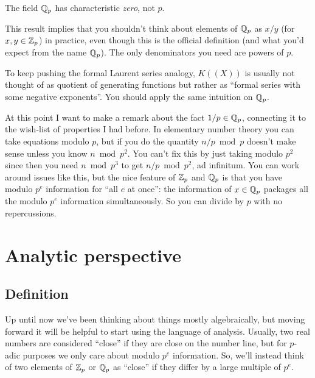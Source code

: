 \begin{remark}
	[Warning]
	The field $\mathbb Q_p$ has characteristic \emph{zero}, not $p$.
\end{remark}
\begin{remark}
	This result implies that you shouldn't think about elements of $\mathbb Q_p$
	as $x/y$ (for $x,y \in \mathbb Z_p$) in practice,
	even though this is the official definition
	(and what you'd expect from the name $\mathbb Q_p$).
	The only denominators you need are powers of $p$.

	To keep pushing the formal Laurent series analogy,
	$K((X))$ is usually not thought of as quotient of generating functions
	but rather as ``formal series with some negative exponents''.
	You should apply the same intuition on $\mathbb Q_p$.
\end{remark}

\begin{remark}
At this point I want to make a remark about the fact $1/p \in \mathbb Q_p$,
connecting it to the wish-list of properties I had before.
In elementary number theory you can take equations modulo $p$,
but if you do the quantity $n/p \bmod{p}$ doesn't make sense
unless you know $n \bmod{p^2}$.
You can't fix this by just taking modulo $p^2$
since then you need $n \bmod{p^3}$ to get $n/p \bmod{p^2}$, ad infinitum.
You can work around issues like this,
but the nice feature of $\mathbb Z_p$ and $\mathbb Q_p$
is that you have modulo $p^e$ information for ``all $e$ at once'':
the information of $x \in \mathbb Q_p$ packages all the modulo $p^e$
information simultaneously.
So you can divide by $p$ with no repercussions.
\end{remark}


\section{Analytic perspective}
\subsection{Definition}
Up until now we've been thinking about things mostly algebraically,
but moving forward it will be helpful to start using the language of analysis.
Usually, two real numbers are considered ``close'' if
they are close on the number line,
but for $p$-adic purposes we only care about modulo $p^e$ information.
So, we'll instead think of two elements of $\mathbb Z_p$ or $\mathbb Q_p$
as ``close'' if they differ by a large multiple of $p^e$.

